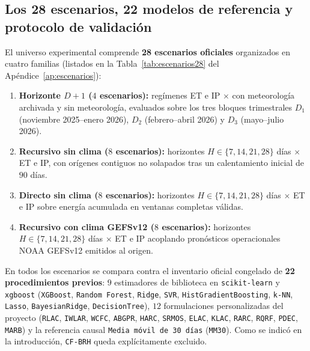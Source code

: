 \subsection{Los 28 escenarios, 22 modelos de referencia y protocolo de validación}

El universo experimental comprende \textbf{28 escenarios oficiales} organizados en cuatro familias (listados en la Tabla~\ref{tab:escenarios28} del Apéndice~\ref{ap:escenarios}):
\begin{enumerate}
    \item \textbf{Horizonte $D+1$ ($4$ escenarios):} regímenes ET e IP $\times$ con meteorología archivada y sin meteorología, evaluados sobre los tres bloques trimestrales $D_1$ (noviembre 2025--enero 2026), $D_2$ (febrero--abril 2026) y $D_3$ (mayo--julio 2026).
    \item \textbf{Recursivo sin clima ($8$ escenarios):} horizontes $H \in \{7,14,21,28\}$ días $\times$ ET e IP, con orígenes contiguos no solapados tras un calentamiento inicial de $90$ días.
    \item \textbf{Directo sin clima ($8$ escenarios):} horizontes $H \in \{7,14,21,28\}$ días $\times$ ET e IP sobre energía acumulada en ventanas completas válidas.
    \item \textbf{Recursivo con clima GEFSv12 ($8$ escenarios):} horizontes $H \in \{7,14,21,28\}$ días $\times$ ET e IP acoplando pronósticos operacionales NOAA GEFSv12 emitidos al origen.
\end{enumerate}

En todos los escenarios se compara contra el inventario oficial congelado de \textbf{22 procedimientos previos}: $9$ estimadores de biblioteca en \texttt{scikit-learn} y \texttt{xgboost} (\texttt{XGBoost}, \texttt{Random Forest}, \texttt{Ridge}, \texttt{SVR}, \texttt{HistGradientBoosting}, \texttt{k-NN}, \texttt{Lasso}, \texttt{BayesianRidge}, \texttt{DecisionTree}), $12$ formulaciones personalizadas del proyecto (\texttt{RLAC}, \texttt{IWLAR}, \texttt{WCFC}, \texttt{ABGPR}, \texttt{HARC}, \texttt{SRMOS}, \texttt{ELAC}, \texttt{KLAC}, \texttt{RARC}, \texttt{RQRF}, \texttt{PDEC}, \texttt{MARB}) y la referencia causal \texttt{Media móvil de 30 días} (\texttt{MM30}). Como se indicó en la introducción, \texttt{CF-BRH} queda explícitamente excluido.

